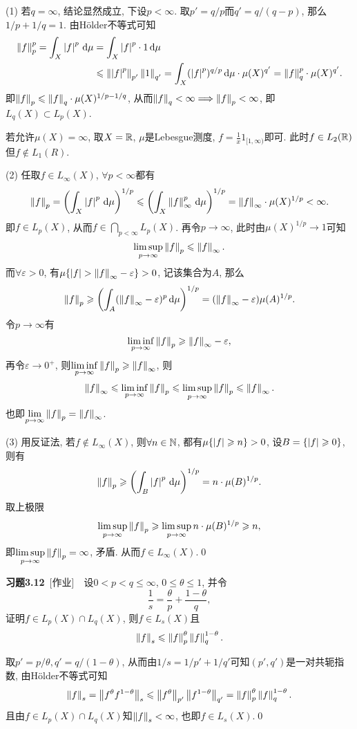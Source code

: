 	\begin{Proof}
	(1) 若$ q=\infty $, 结论显然成立, 下设$ p<\infty $. 取$ p'=q/p $而$ q'=q/(q-p) $, 那么$ 1/p+1/q=1 $. 由H\"older不等式可知
	\[
	\begin{aligned}
	\left\| f \right\|_p^p=\int_X\left| f \right| ^p\,\mathrm{d}\mu&=\int_X\left| f \right| ^p\cdot 1\,\mathrm{d}\mu\\
	&\leqslant\left\| \left| f \right| ^p \right\|_{p'}\left\| 1 \right\|_{q'}=\int_X(\left| f \right| ^p)^{q/p}\,\mathrm{d}\mu\cdot\mu(X)^{q'}=\left\| f \right\|_q^p\cdot\mu(X)^{q'}.
	\end{aligned}
	\]
	即$ \left\| f \right\|_p\leqslant\left\| f \right\|_q\cdot\mu(X)^{1/p-1/q} $, 从而$ \left\| f \right\|_q<\infty\Longrightarrow\left\| f \right\|_p<\infty $, 即$ L_q(X)\subset L_p(X) $.
	
	若允许$ \mu(X)=\infty $, 取$ X=\mathbb{R} $, $ \mu $是Lebesgue测度, $ f=\frac{1}{x}1_{[1,\infty)} $即可. 此时$ f\in L_2(\mathbb{R}) $但$ f\notin L_1(R) $.
	
	(2) 任取$ f\in L_\infty(X) $, $ \forall p<\infty $都有
	\[
	\left\| f \right\|_p=\left(\int_X\left| f \right| ^p\,\mathrm{d}\mu\right)^{1/p}\leqslant\left(\int_X\left\| f \right\|_\infty^p\,\mathrm{d}\mu\right)^{1/p}=\left\| f \right\|_\infty\cdot\mu(X)^{1/p}<\infty.
	\]
	即$ f\in L_p(X) $, 从而$ f\in\bigcap_{p<\infty}L_p(X) $. 再令$ p\to\infty $, 此时由$ \mu(X)^{1/p}\to 1 $可知
	\[
	\limsup_{p\to\infty}\left\| f \right\|_p\leqslant\left\| f \right\|_\infty.
	\]
	而$ \forall\varepsilon>0 $, 有$ \mu\{ \left| f \right| >\left\| f \right\|_\infty-\varepsilon \}>0 $, 记该集合为$ A $, 那么
	\[
	\left\| f \right\|_p\geqslant\left(\int_A(\left\| f \right\|_\infty-\varepsilon)^p\,\mathrm{d}\mu\right)^{1/p}=(\left\| f \right\|_\infty-\varepsilon)\mu(A)^{1/p}.
	\]
	令$ p\to\infty $有
	\[
	\liminf_{p\to\infty}\left\| f \right\|_p\geqslant\left\| f \right\|_\infty-\varepsilon,
	\]
	再令$ \varepsilon\to 0^+ $, 则$ \liminf\limits_{p\to\infty}\left\| f \right\|_p\geqslant\left\| f \right\|_\infty $, 则
	\[
	\left\| f \right\|_\infty\leqslant\liminf_{p\to\infty}\left\| f \right\|_p\leqslant\limsup_{p\to\infty}\left\| f \right\|_p\leqslant\left\| f \right\|_\infty.
	\]
	也即$ \lim\limits_{p\to\infty}\left\| f \right\|_p=\left\| f \right\|_\infty $.
	
	(3) 用反证法, 若$ f\notin L_\infty(X) $, 则$ \forall n\in\mathbb{N} $, 都有$ \mu\{ \left| f \right| \geqslant n \}>0 $, 设$ B=\{ \left| f \right| \geqslant 0 \} $, 则有
	\[
	\left\| f \right\|_p\geqslant\left(\int_B\left| f \right| ^p\,\mathrm{d}\mu\right)^{1/p}=n\cdot\mu(B)^{1/p}.
	\]
	取上极限
	\[
	\limsup_{p\to\infty}\left\| f \right\|_p\geqslant\limsup_{p\to\infty}n\cdot\mu(B)^{1/p}\geqslant n,
	\]
	即$ \limsup\limits_{p\to\infty}\left\| f \right\|_p=\infty $, 矛盾. 从而$ f\in L_\infty(X) $.\qed
	\end{Proof}

	\textbf{习题3.12}\ [作业]\ \ 设$ 0<p<q\leqslant\infty $, $ 0\leqslant\theta\leqslant 1 $, 并令
	\[
	\frac{1}{s}=\frac{\theta}{p}+\frac{1-\theta}{q},
	\]
	证明$ f\in L_p(X)\cap L_q(X) $, 则$ f\in L_s(X) $且
	\[
	\left\| f \right\|_s\leqslant\left\| f \right\|_p^{\theta}\left\| f \right\|_q^{1-\theta}.
	\]
	\begin{Proof}
	取$ p'=p/\theta, q'=q/(1-\theta) $, 从而由$ 1/s=1/p'+1/q' $可知$ (p',q') $是一对共轭指数, 由H\"older不等式可知
	\[
	\left\| f \right\|_s=\left\| f^\theta f^{1-\theta} \right\|_s\leqslant\left\| f^\theta \right\|_{p'}\left\| f^{1-\theta} \right\|_{q'}=\left\| f \right\|_p^\theta\left\| f \right\|_q^{1-\theta}.
	\]
	且由$ f\in L_p(X)\cap L_q(X) $知$ \left\| f \right\|_s<\infty $, 也即$ f\in L_s(X) $.\qed
	\end{Proof}

